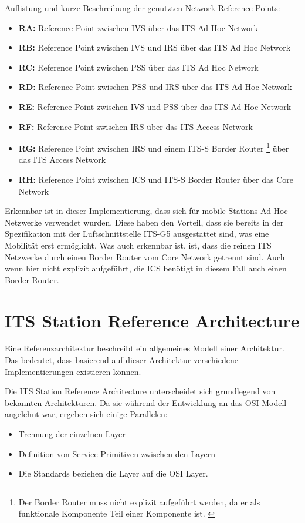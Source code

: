 Auflistung und kurze Beschreibung der genutzten Network Reference Points:
\begin{itemize}
	\item \textbf{RA: } Reference Point zwischen \ac{IVS} über das ITS Ad Hoc Network
	\item \textbf{RB: } Reference Point zwischen \ac{IVS} und \ac{IRS} über das ITS Ad Hoc Network
	\item \textbf{RC: } Reference Point zwischen \ac{PSS} über das ITS Ad Hoc Network
	\item \textbf{RD: } Reference Point zwischen \ac{PSS} und \ac{IRS} über das ITS Ad Hoc Network
	\item \textbf{RE: } Reference Point zwischen \ac{IVS} und \ac{PSS} über das ITS Ad Hoc Network
	\item \textbf{RF: } Reference Point zwischen \ac{IRS} über das ITS Access Network
	\item \textbf{RG: } Reference Point zwischen \ac{IRS} und einem ITS-S Border Router \footnote{Der Border Router muss nicht explizit aufgeführt werden, da er als funktionale Komponente Teil einer Komponente ist. \label{ftn:borderRouter}} über das ITS Access Network 
	\item \textbf{RH: } Reference Point zwischen \ac{ICS} und ITS-S Border Router  über das Core Network		
\end{itemize}

Erkennbar ist in dieser Implementierung, dass sich für mobile Stations Ad Hoc Netzwerke verwendet wurden. Diese haben den Vorteil, dass sie bereits in der Spezifikation mit der Luftschnittstelle ITS-G5 ausgestattet sind, was eine Mobilität erst ermöglicht. Was auch erkennbar ist, ist, dass die reinen ITS Netzwerke durch einen Border Router vom Core Network getrennt sind. Auch wenn hier nicht explizit aufgeführt, die \ac{ICS} benötigt in diesem Fall auch einen Border Router.

 
\section{ITS Station Reference Architecture}
Eine Referenzarchitektur beschreibt ein allgemeines Modell einer Architektur. Das bedeutet, dass basierend auf dieser Architektur verschiedene Implementierungen existieren können. 

Die \ac{ITS} Station Reference Architecture unterscheidet sich grundlegend von bekannten Architekturen. Da sie während der Entwicklung an das \ac{OSI} Modell angelehnt war, ergeben sich einige Parallelen:
\begin{itemize}
	\item Trennung der einzelnen Layer
	\item Definition von Service Primitiven zwischen den Layern
	\item Die Standards beziehen die Layer auf die \ac{OSI} Layer. 
\end{itemize}


